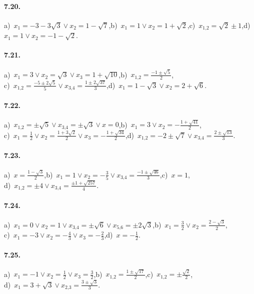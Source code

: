 \paragraph{7.20.} a)~$x_1=-3-3\sqrt 3\vee x_2=1-\sqrt 7$,\quad b)~$x_1=1\vee x_2=1+\sqrt 2$,\quad c)~$x_{1\text{,}2}=\sqrt 2\pm 1$,\quad d)~$x_1=1\vee x_2=-1-\sqrt 2$.

\paragraph{7.21.} a)~$x_1=3\vee x_2=\sqrt 3\vee x_3=1+\sqrt{10}$,\quad b)~$x_{1\text{,}2}=\frac{-1\pm \sqrt 5} 2$,\protect\\
\quad c)~$x_{1\text{,}2}=\frac{-5\pm 2\sqrt 5} 5\vee x_{3\text{,}4}=\frac{1\pm 2\sqrt{37}} 3$,\quad d)~$x_1=1-\sqrt 3\vee x_2=2+\sqrt 6$.

\paragraph{7.22.} a)~$x_{1\text{,}2}=\pm \sqrt 5\vee x_{3\text{,}4}=\pm \sqrt 3\vee x=0$,\quad b)~$x_1=3\vee x_2=-\frac{1+\sqrt{41}} 2$,\protect\\
\quad c)~$x_1=\frac 1 2\vee x_2=\frac{1+3\sqrt 2} 2\vee x_3=-\frac{1+\sqrt{34}} 2$,\quad d)~$x_{1\text{,}2}=-2\pm \sqrt 7\vee x_{3\text{,}4}=\frac{2\pm \sqrt{13}} 3$.

\paragraph{7.23.} a)~$x=\frac{1-\sqrt 3} 2$,\quad b)~$x_1=1\vee x_2=-\frac 3 5\vee x_{3\text{,}4}=\frac{-1\pm \sqrt{46}} 3$,\quad c)~$x=1$,\protect\\
\quad d)~$x_{1\text{,}2}=\pm 4\vee x_{3\text{,}4}=\frac{\pm 1+\sqrt{257}} 4$.

\paragraph{7.24.} a)~$x_1=0\vee x_2=1\vee x_{3\text{,}4}=\pm \sqrt 6\vee x_{5\text{,}6}=\pm 2\sqrt 3$,\quad b)~$x_1=\frac 3 2\vee x_2=\frac{2-\sqrt 3} 2$,\protect\\
\quad c)~$x_1=-3\vee x_2=-\frac 4 3\vee x_3=-\frac 2 3$,\quad d)~$x=-\frac 1 2$.

\paragraph{7.25.} a)~$x_1=-1\vee x_2=\frac 1 2\vee x_3=\frac 3 2$,\quad b)~$x_{1\text{,}2}=\frac{1\pm \sqrt{17}} 2$,\quad c)~$x_{1\text{,}2}=\pm \frac{\sqrt 2} 2$,\protect\\
\quad d)~$x_1=3+\sqrt 3\vee x_{2\text{,}3}=\frac{3\pm \sqrt 3} 3$.


